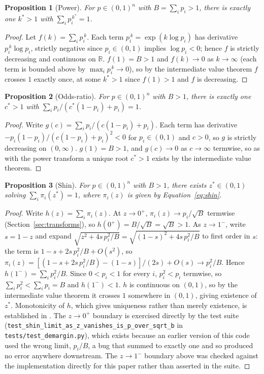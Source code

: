 \documentclass[11pt,a4paper]{article}
\newtheorem{proposition}{Proposition}
\begin{document}
\begin{proposition}[Power]
For $p \in (0,1)^n$ with $B = \sum_i p_i > 1$, there is exactly one
$k^\ast > 1$ with $\sum_i p_i^{\,k^\ast} = 1$.
\end{proposition}
\begin{proof}
Let $f(k) = \sum_i p_i^{\,k}$. Each term $p_i^{\,k} = \exp(k \log p_i)$ has
derivative $p_i^{\,k}\log p_i$, strictly negative since $p_i \in (0,1)$
implies $\log p_i < 0$; hence $f$ is strictly decreasing and continuous on
$\mathbb{R}$. $f(1) = B > 1$ and $f(k) \to 0$ as $k \to \infty$ (each term is
bounded above by $\max_i p_i^{\,k} \to 0$), so by the intermediate value
theorem $f$ crosses $1$ exactly once, at some $k^\ast > 1$ since $f(1) > 1$
and $f$ is decreasing.
\end{proof}

\begin{proposition}[Odds-ratio]
For $p \in (0,1)^n$ with $B > 1$, there is exactly one $c^\ast > 1$ with
$\sum_i p_i / (c^\ast(1-p_i) + p_i) = 1$.
\end{proposition}
\begin{proof}
Write $g(c) = \sum_i p_i / (c(1-p_i) + p_i)$. Each term has derivative
$-p_i(1-p_i) / (c(1-p_i)+p_i)^2 < 0$ for $p_i \in (0,1)$ and $c > 0$, so $g$
is strictly decreasing on $(0,\infty)$. $g(1) = B > 1$, and $g(c) \to 0$ as
$c \to \infty$ termwise, so as with the power transform a unique root
$c^\ast > 1$ exists by the intermediate value theorem.
\end{proof}

\begin{proposition}[Shin]
For $p \in (0,1)^n$ with $B > 1$, there exists $z^\ast \in (0,1)$ solving
$\sum_i \pi_i(z^\ast) = 1$, where $\pi_i(z)$ is given by
Equation~\eqref{eq:shin}.
\end{proposition}
\begin{proof}
Write $h(z) = \sum_i \pi_i(z)$. At $z \to 0^+$, $\pi_i(z) \to p_i / \sqrt{B}$
termwise (Section~\ref{sec:transforms}), so $h(0^+) = B / \sqrt{B} =
\sqrt{B} > 1$. As $z \to 1^-$, write $s = 1-z$ and expand
$\sqrt{z^2 + 4s\,p_i^2/B} = \sqrt{(1-s)^2 + 4s\,p_i^2/B}$ to first order in
$s$: the term is $1 - s + 2s\,p_i^2/B + O(s^2)$, so
$\pi_i(z) = [(1-s+2s\,p_i^2/B) - (1-s)]/(2s) + O(s) \to p_i^2 / B$. Hence
$h(1^-) = \sum_i p_i^2 / B$. Since $0 < p_i < 1$ for every $i$, $p_i^2 <
p_i$ termwise, so $\sum_i p_i^2 < \sum_i p_i = B$ and $h(1^-) < 1$. $h$ is
continuous on $(0,1)$, so by the intermediate value theorem it crosses $1$
somewhere in $(0,1)$, giving existence of $z^\ast$. Monotonicity of $h$,
which gives uniqueness rather than merely existence, is established in
\citet{shin1993}. The $z \to 0^+$ boundary is exercised directly by the test
suite (\texttt{test\_shin\_limit\_as\_z\_vanishes\_is\_p\_over\_sqrt\_b} in
\texttt{tests/test\_demargin.py}), which exists because an earlier version of
this code used the wrong limit, $p_i/B$, a bug that summed to exactly one and
so produced no error anywhere downstream. The $z \to 1^-$ boundary above was
checked against the implementation directly for this paper rather than
asserted in the suite.
\end{proof}
\end{document}
